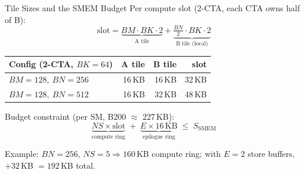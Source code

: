 \documentclass[aspectratio=169,professionalfonts]{beamer}
\begin{document}
\begin{frame}{Tile Sizes and the SMEM Budget}
  Per compute slot (2-CTA, each CTA owns half of B):
  \[
    \text{slot} = \underbrace{BM\cdot BK\cdot 2}_{\text{A tile}}
                + \underbrace{\tfrac{BN}{2}\cdot BK\cdot 2}_{\text{B tile (local)}}
  \]

  \begin{table}
    \centering\small
    \begin{tabular}{lrrr}
      \toprule
      Config (2-CTA, $BK{=}64$) & A tile & B tile & slot \\
      \midrule
      $BM{=}128,\ BN{=}256$ & 16\,KB & 16\,KB & 32\,KB \\
      $BM{=}128,\ BN{=}512$ & 16\,KB & 32\,KB & 48\,KB \\
      \bottomrule
    \end{tabular}
  \end{table}

  \vspace{0.15cm}
  Budget constraint (per SM, B200 $\approx$ 227\,KB):
  \[
    \underbrace{NS \times \text{slot}}_{\text{compute ring}}
    \;+\;
    \underbrace{E \times 16\,\text{KB}}_{\text{epilogue ring}}
    \;\le\; S_{\text{SMEM}}
  \]

  \footnotesize Example: $BN{=}256$, $NS{=}5 \Rightarrow 160$\,KB compute ring;
  with $E{=}2$ store buffers, $+32$\,KB $= 192$\,KB total.
\end{frame}
\end{document}
